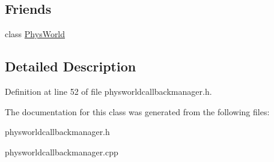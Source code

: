 \subsection*{Friends}
\begin{DoxyCompactItemize}
\item 
\hypertarget{classPhysWorldCallBackManager_a375fd37c70c941f0442997a60fdb05c7}{
class \hyperlink{classPhysWorldCallBackManager_a375fd37c70c941f0442997a60fdb05c7}{PhysWorld}}
\label{d4/d84/classPhysWorldCallBackManager_a375fd37c70c941f0442997a60fdb05c7}

\end{DoxyCompactItemize}


\subsection{Detailed Description}


Definition at line 52 of file physworldcallbackmanager.h.



The documentation for this class was generated from the following files:\begin{DoxyCompactItemize}
\item 
physworldcallbackmanager.h\item 
physworldcallbackmanager.cpp\end{DoxyCompactItemize}

